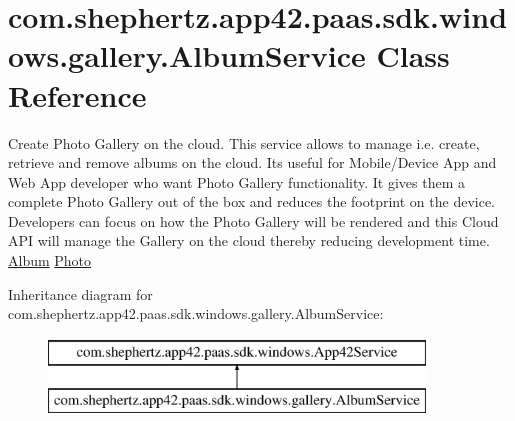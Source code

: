 \hypertarget{classcom_1_1shephertz_1_1app42_1_1paas_1_1sdk_1_1windows_1_1gallery_1_1_album_service}{\section{com.\+shephertz.\+app42.\+paas.\+sdk.\+windows.\+gallery.\+Album\+Service Class Reference}
\label{classcom_1_1shephertz_1_1app42_1_1paas_1_1sdk_1_1windows_1_1gallery_1_1_album_service}
}


Create Photo Gallery on the cloud. This service allows to manage i.\+e. create, retrieve and remove albums on the cloud. Its useful for Mobile/\+Device App and Web App developer who want Photo Gallery functionality. It gives them a complete Photo Gallery out of the box and reduces the footprint on the device. Developers can focus on how the Photo Gallery will be rendered and this Cloud A\+P\+I will manage the Gallery on the cloud thereby reducing development time. \hyperlink{}{Album} \hyperlink{}{Photo}  


Inheritance diagram for com.\+shephertz.\+app42.\+paas.\+sdk.\+windows.\+gallery.\+Album\+Service\+:\begin{figure}[H]
\begin{center}
\leavevmode
\includegraphics[height=2.000000cm]{classcom_1_1shephertz_1_1app42_1_1paas_1_1sdk_1_1windows_1_1gallery_1_1_album_service}
\end{center}
\end{figure}
